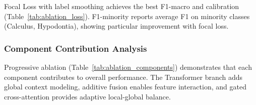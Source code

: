 \begin{table}[htbp]
\centering
\caption{Loss Function Comparison}
\label{tab:ablation_loss}
\small
{}
\end{table}

Focal Loss with label smoothing achieves the best F1-macro and calibration (Table~\ref{tab:ablation_loss}). F1-minority reports average F1 on minority classes (Calculus, Hypodontia), showing particular improvement with focal loss.

\subsubsection{Component Contribution Analysis}

\begin{table}[htbp]
\centering
\caption{Component Contribution Analysis (Progressive Ablation)}
\label{tab:ablation_components}
\small
{}
\end{table}

Progressive ablation (Table~\ref{tab:ablation_components}) demonstrates that each component contributes to overall performance. The Transformer branch adds global context modeling, additive fusion enables feature interaction, and gated cross-attention provides adaptive local-global balance.